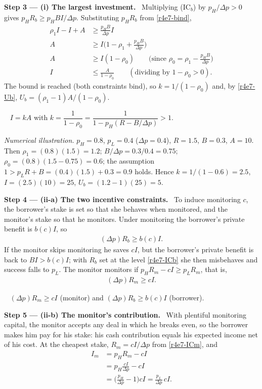 \documentclass[11pt,a4paper]{article}
\newcommand{\step}[2]{\par\medskip\noindent\textbf{Step #1 --- #2.}~}
\newcommand{\answer}[1]{\par\smallskip\noindent\fbox{\textbf{Answer #1.}}~}
\begin{document}
\step{3}{(i) The largest investment} Multiplying (IC$_b$) by $p_H/\Delta p>0$ gives
$p_HR_b\ge p_HBI/\Delta p$. Substituting $p_HR_b$ from \eqref{r4e7-bind},
\begin{align}
  \rho_1I-I+A &\ge \frac{p_HB}{\Delta p}I \nonumber\\
  A &\ge I\Big(1-\rho_1+\frac{p_HB}{\Delta p}\Big) \nonumber\\
  A &\ge I(1-\rho_0) \qquad\Big(\text{since }\rho_0=\rho_1-\frac{p_HB}{\Delta p}\Big) \nonumber\\
  I &\le \frac{A}{1-\rho_0} \qquad(\text{dividing by }1-\rho_0>0). \label{r4e7-k}
\end{align}
The bound is reached (both constraints bind), so $k=1/(1-\rho_0)$ and, by \eqref{r4e7-Ub},
$U_b=(\rho_1-1)A/(1-\rho_0)$.

\answer{(i)} $I=kA$ with $k=\dfrac{1}{1-\rho_0}=\dfrac{1}{1-p_H(R-B/\Delta p)}>1$.

\emph{Numerical illustration.} $p_H=0.8$, $p_L=0.4$ ($\Delta p=0.4$), $R=1.5$, $B=0.3$,
$A=10$. Then $\rho_1=(0.8)(1.5)=1.2$; $B/\Delta p=0.3/0.4=0.75$; $\rho_0=(0.8)(1.5-0.75)=0.6$;
the assumption $1>p_LR+B=(0.4)(1.5)+0.3=0.9$ holds. Hence $k=1/(1-0.6)=2.5$, $I=(2.5)(10)=25$,
$U_b=(1.2-1)(25)=5$.

\step{4}{(ii-a) The two incentive constraints} To induce monitoring $c$, the borrower's stake is
set so that she behaves when monitored, and the monitor's stake so that he monitors. Under
monitoring the borrower's private benefit is $b(c)I$, so
\begin{align}
  (\Delta p)R_b \ge b(c)I. \label{r4e7-ICb}
\end{align}
If the monitor skips monitoring he saves $cI$, but the borrower's private benefit is back to
$BI>b(c)I$; with $R_b$ set at the level \eqref{r4e7-ICb} she then misbehaves and success falls
to $p_L$. The monitor monitors if $p_HR_m-cI\ge p_LR_m$, that is,
\begin{align}
  (\Delta p)R_m \ge cI. \label{r4e7-ICm}
\end{align}

\answer{(ii-a)} $(\Delta p)R_m\ge cI$ (monitor) and $(\Delta p)R_b\ge b(c)I$ (borrower).

\step{5}{(ii-b) The monitor's contribution} With plentiful monitoring capital, the monitor
accepts any deal in which he breaks even, so the borrower makes him pay for his stake: his cash
contribution equals his expected income net of his cost. At the cheapest stake,
$R_m=cI/\Delta p$ from \eqref{r4e7-ICm}, and
\begin{align}
  I_m &= p_HR_m-cI \nonumber\\
      &= p_H\frac{cI}{\Delta p}-cI \nonumber\\
      &= \Big(\frac{p_H}{\Delta p}-1\Big)cI = \frac{p_L}{\Delta p}\,cI. \label{r4e7-Im}
\end{align}
\end{document}
